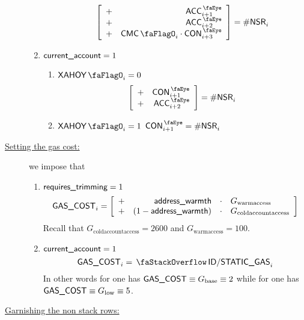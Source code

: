 \begin{description}
\begin{enumerate}
\begin{enumerate}
						\[
							\left[ \begin{array}{cr}
								+ & \peekAccount_{i + 1} \\ 
								+ & \peekAccount_{i + 2} \\ 
								+ & \cmc_{i} \cdot \peekContext_{i + 3} \\ 
							\end{array} \right]
							= \nonStackRows_{i}
						\]
				\end{enumerate}
			\item \If $\textsf{current\_account}   = 1$ \Then
				\begin{enumerate}
					\item \If $\xAhoy_{i} = 0$ \Then
						\[
							\left[ \begin{array}{cr}
								+ & \peekContext_{i + 1} \\ 
								+ & \peekAccount_{i + 2} \\ 
							\end{array} \right]
							= \nonStackRows_{i}
						\]
					\item \If $\xAhoy_{i} = 1$ \Then $\peekContext_{i + 1} = \nonStackRows_{i}$
				\end{enumerate}
		\end{enumerate}
	\item[\underline{Setting the gas cost:}]
		we impose that
		\begin{enumerate}
			\item \If $\textsf{requires\_trimming} = 1$ \Then
				\[
					\textsf{GAS}\textsf{\_COST}_{i}
					=
					\left[ \begin{array}{crcl}
						+ & \textsf{address\_warmth}       & \cdot & G_{\text{warmaccess}}        \\
						+ & (1 - \textsf{address\_warmth}) & \cdot & G_{\text{coldaccountaccess}} \\
					\end{array} \right]
				\]
				\saNote{} Recall that
				$G_{\text{coldaccountaccess}} = 2600$ and
				$G_{\text{warmaccess}} = 100$.
			\item \If $\textsf{current\_account}   = 1$ \Then
				\[
					\gasCost_{i} = \stackStaticGas_{i}
				\]
				\saNote{} In other words for
				    one has $\textsf{GAS}\textsf{\_COST} \equiv G_{\text{base}} \equiv 2$ while for
				 one has $\textsf{GAS}\textsf{\_COST} \equiv G_{\text{low}}  \equiv 5$.
		\end{enumerate}
	\item[\underline{Garnishing the non stack rows:}]

\end{description}
